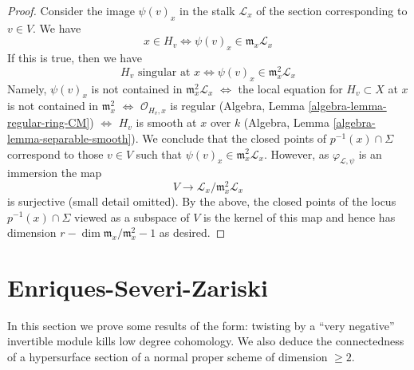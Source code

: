 \begin{proof}
\medskip\noindent
Consider the image $\psi(v)_x$ in the stalk $\mathcal{L}_x$
of the section corresponding to $v \in V$. We have
$$
x \in H_v \Leftrightarrow \psi(v)_x \in \mathfrak m_x\mathcal{L}_x
$$
If this is true, then we have
$$
H_v\text{ singular at }x \Leftrightarrow
\psi(v)_x \in \mathfrak m_x^2\mathcal{L}_x
$$
Namely, $\psi(v)_x$ is not contained in $\mathfrak m_x^2\mathcal{L}_x$
$\Leftrightarrow$
the local equation for $H_v \subset X$ at $x$ is not contained
in $\mathfrak m_x^2$
$\Leftrightarrow$
$\mathcal{O}_{H_v, x}$ is regular
(Algebra, Lemma \ref{algebra-lemma-regular-ring-CM})
$\Leftrightarrow$
$H_v$ is smooth at $x$ over $k$
(Algebra, Lemma \ref{algebra-lemma-separable-smooth}).
We conclude that the closed points of $p^{-1}(x) \cap \Sigma$ correspond
to those $v \in V$ such that $\psi(v)_x \in \mathfrak m_x^2\mathcal{L}_x$.
However, as $\varphi_{\mathcal{L}, \psi}$ is an immersion the
map
$$
V \longrightarrow \mathcal{L}_x/\mathfrak m_x^2\mathcal{L}_x
$$
is surjective (small detail omitted). By the above, the closed points
of the locus $p^{-1}(x) \cap \Sigma$ viewed as a subspace of $V$
is the kernel of this map and hence has dimension
$r - \dim \mathfrak m_x/\mathfrak m_x^2 - 1$ as desired.
\end{proof}






\section{Enriques-Severi-Zariski}
\label{section-vanishing-negative}

\noindent
In this section we prove some results of the form: twisting by
a ``very negative'' invertible module kills low
degree cohomology. We also deduce the connectedness
of a hypersurface section of a normal proper scheme of
dimension $\geq 2$.

